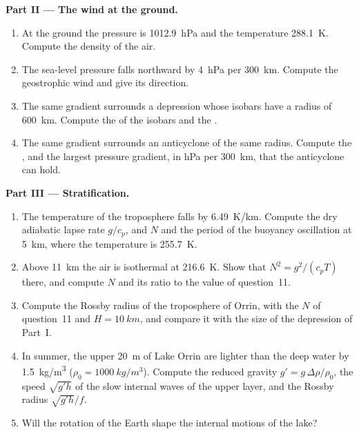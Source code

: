 \begin{problem}
\medskip\noindent\textbf{Part II --- The wind at the ground.}
\begin{enumerate}[resume]
\item At the ground the pressure is \qty{1012.9}{hPa} and the temperature
  \qty{288.1}{K}. Compute the density of the air.
\item The sea-level pressure falls northward by \qty{4}{hPa} per
  \qty{300}{km}. Compute the geostrophic wind and give its direction.
\item The same gradient surrounds a depression whose isobars have a radius
  of \qty{600}{km}. Compute the  of the isobars and the
  .
\item The same gradient surrounds an anticyclone of the same radius.
  Compute the , and the largest pressure gradient, in
  \unit{hPa} per \qty{300}{km}, that the anticyclone can hold.
\end{enumerate}

\medskip\noindent\textbf{Part III --- Stratification.}
\begin{enumerate}[resume]
\item The temperature of the troposphere falls by \qty{6.49}{K/km}.
  Compute the dry adiabatic lapse rate $g/c_p$, and $N$ and the period of
  the buoyancy oscillation at \qty{5}{km}, where the temperature is
  \qty{255.7}{K}.
\item Above \qty{11}{km} the air is isothermal at \qty{216.6}{K}. Show that
  $N^2 = g^2/(c_pT)$ there, and compute $N$ and its ratio to the value of
  question~11.
\item Compute the Rossby radius of the troposphere of Orrin, with the $N$ of
  question~11 and $H = \qty{10}{km}$, and compare it with the size of the
  depression of Part~I.
\item In summer, the upper \qty{20}{m} of Lake Orrin are lighter than the
  deep water by \qty{1.5}{kg/m^3} ($\rho_0 = \qty{1000}{kg/m^3}$). Compute
  the reduced gravity $g' = g\,\Delta\rho/\rho_0$, the speed $\sqrt{g'h}$ of
  the slow internal waves of the upper layer, and the Rossby radius
  $\sqrt{g'h}/f$.
\item Will the rotation of the Earth shape the internal motions of the lake?
\end{enumerate}


\end{problem}
